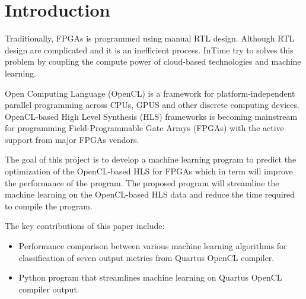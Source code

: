 \chapter{Introduction}
Traditionally, FPGAs is programmed using manual RTL design. Although RTL design are complicated and it is an inefficient process. InTime \citep{kapre2015intime} try to solves this problem by coupling the compute power of cloud-based technologies and machine learning.   

Open Computing Language (OpenCL) \citep{opencl} is a framework for platform-independent parallel programming across CPUs, GPUS and other discrete computing devices. OpenCL-based High Level Synthesis (HLS) frameworks is becoming mainstream for programming Field-Programmable Gate Arrays (FPGAs) with the active support from major FPGAs vendors. \citep{rich2015how}

The goal of this project is to develop a machine learning program to predict the optimization of the OpenCL-based HLS for FPGAs which in term will improve the performance of the program. The proposed program will streamline the machine learning on the OpenCL-based HLS data and reduce the time required to compile the program.



The key contributions of this paper include:
\begin{itemize}
    \item Performance comparison between various machine learning algorithms for classification of seven output metrics from Quartus OpenCL compiler.
    \item Python program that streamlines machine learning on Quartus OpenCL compiler output.
\end{itemize}
